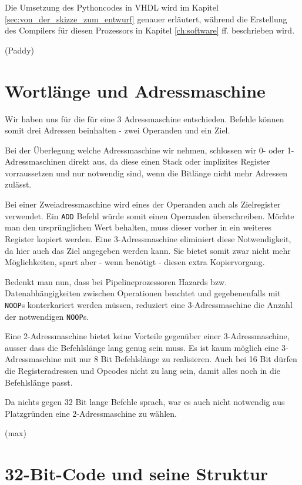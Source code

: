 \documentclass[paper=a4,fontsize=12pt,twocolumn]{scrreprt}
\begin{document}
Die Umsetzung des Pythoncodes in VHDL wird im Kapitel \ref{sec:von_der_skizze_zum_entwurf} genauer erläutert, während die Erstellung des Compilers für diesen Prozessors in Kapitel \ref{ch:software} ff. beschrieben wird.

(Paddy)

\section{Wortlänge und Adressmaschine}
\label{sec:wortlaenge_und_adressmaschine}

Wir haben uns für die für eine 3 Adressmaschine entschieden.
Befehle können somit drei Adressen beinhalten - zwei Operanden und ein Ziel.

Bei der Überlegung welche Adressmaschine wir nehmen, schlossen wir 0- oder 1- Adressmaschinen direkt aus, da diese einen Stack oder implizites Register vorraussetzen und nur notwendig sind, wenn die Bitlänge nicht mehr Adressen zulässt.

Bei einer Zweiadressmaschine wird eines der Operanden auch als Zielregister verwendet.
Ein \texttt{ADD} Befehl würde somit einen Operanden überschreiben.
Möchte man den ursprünglichen Wert behalten, muss dieser vorher in ein weiteres Register kopiert werden.
Eine 3-Adressmaschine eliminiert diese Notwendigkeit, da hier auch das Ziel angegeben werden kann.
Sie bietet somit zwar nicht mehr Möglichkeiten, spart aber - wenn benötigt - diesen extra Kopiervorgang.

Bedenkt man nun, dass bei Pipelineprozessoren Hazards bzw. Datenabhängigkeiten zwischen Operationen beachtet und gegebenenfalls mit \texttt{NOOP}s konterkariert werden müssen, reduziert eine 3-Adressmaschine die Anzahl der notwendigen \texttt{NOOP}s.

Eine 2-Adressmaschine bietet keine Vorteile gegenüber einer 3-Adressmaschine, ausser dass die Befehlslänge lang genug sein muss.
Es ist kaum möglich eine 3-Adressmaschine mit nur 8 Bit Befehlslänge zu realisieren.
Auch bei 16 Bit dürfen die Registeradressen und Opcodes nicht zu lang sein, damit alles noch in die Befehlslänge passt.

Da nichts gegen 32 Bit lange Befehle sprach, war es auch nicht notwendig aus Platzgründen eine 2-Adressmaschine zu wählen.

(max)

\section{32-Bit-Code und seine Struktur}
\label{sec:32_bit_code_und_seine_Struktur}
\end{document}

